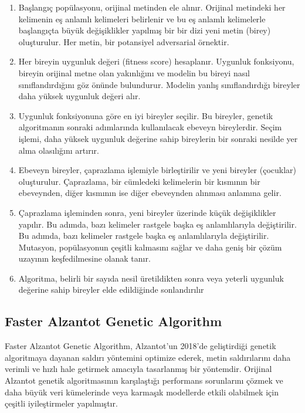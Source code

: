 \begin{enumerate}
    \item Başlangıç popülasyonu, orijinal metinden ele alınır. Orijinal metindeki her kelimenin eş anlamlı kelimeleri belirlenir ve bu eş anlamlı kelimelerle başlangıçta büyük değişiklikler yapılmış bir bir dizi yeni metin (birey) oluşturulur. Her metin, bir potansiyel adversarial örnektir.
    \item Her bireyin uygunluk değeri (fitness score) hesaplanır. Uygunluk fonksiyonu, bireyin orijinal metne olan yakınlığını ve modelin bu bireyi nasıl sınıflandırdığını göz önünde bulundurur. Modelin yanlış sınıflandırdığı bireyler daha yüksek uygunluk değeri alır.
    \item Uygunluk fonksiyonuna göre en iyi bireyler seçilir. Bu bireyler, genetik algoritmanın sonraki adımlarında kullanılacak ebeveyn bireylerdir. Seçim işlemi, daha yüksek uygunluk değerine sahip bireylerin bir sonraki nesilde yer alma olasılığını artırır.
    \item Ebeveyn bireyler, çaprazlama işlemiyle birleştirilir ve yeni bireyler (çocuklar) oluşturulur. Çaprazlama, bir cümledeki kelimelerin bir kısmının bir ebeveynden, diğer kısmının ise diğer ebeveynden alınması anlamına gelir.
    \item Çaprazlama işleminden sonra, yeni bireyler üzerinde küçük değişiklikler yapılır. Bu adımda, bazı kelimeler rastgele başka eş anlamlılarıyla değiştirilir. Bu adımda, bazı kelimeler rastgele başka eş anlamlılarıyla değiştirilir. Mutasyon, popülasyonun çeşitli kalmasını sağlar ve daha geniş bir çözüm uzayının keşfedilmesine olanak tanır.
    \item Algoritma, belirli bir sayıda nesil üretildikten sonra veya yeterli uygunluk değerine sahip bireyler elde edildiğinde sonlandırılır
\end{enumerate}

\newpage

\subsection{Faster Alzantot Genetic Algorithm}

Faster Alzantot Genetic Algorithm, Alzantot'un 2018’de geliştirdiği genetik algoritmaya dayanan saldırı yöntemini optimize ederek, metin saldırılarını daha verimli ve hızlı hale getirmek amacıyla tasarlanmış bir yöntemdir. Orijinal Alzantot genetik algoritmasının karşılaştığı performans sorunlarını çözmek ve daha büyük veri kümelerinde veya karmaşık modellerde etkili olabilmek için çeşitli iyileştirmeler yapılmıştır.

